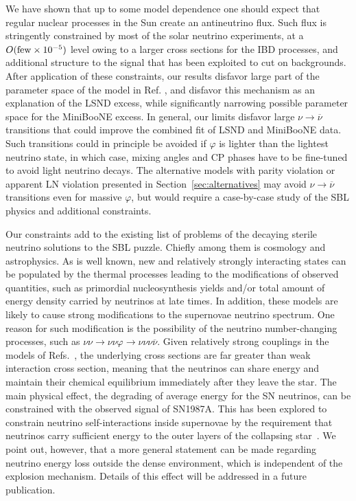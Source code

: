 \documentclass[
reprint,
superscriptaddress,
showpacs,
preprintnumbers,
nofootinbib,
nobibnotes,
amsmath,
amssymb, 
aps,
prd,
floatfix
]{revtex4-1}
\newcommand{\refsec}[1]{Section~\ref{#1}}
\renewcommand{\phi}{\varphi}
\begin{document}
We have shown that up to some model dependence one should expect that regular nuclear processes in the Sun create an antineutrino flux. Such flux is stringently constrained by most of the solar neutrino experiments, at a $O({\rm few}\times 10^{-5})$ level owing to a larger cross sections for the IBD processes, and additional structure to the signal that has been exploited to cut on backgrounds. After application of these constraints, our results disfavor large part of the parameter space of the model in Ref. \cite{Dentler:2019dhz}, and disfavor this mechanism as an explanation of the LSND excess, while significantly narrowing possible parameter space for the MiniBooNE excess. In general, our limits disfavor large $\nu\to\overline{\nu}$ transitions that could improve the combined fit of LSND and MiniBooNE data. Such transitions could in principle be avoided if $\phi$ is lighter than the lightest neutrino state, in which case, mixing angles and CP phases have to be fine-tuned to avoid light neutrino decays. The alternative models with parity violation or apparent LN violation presented in \refsec{sec:alternatives} may avoid $\nu\to\overline{\nu}$ transitions even for massive $\phi$, but would require a case-by-case study of the SBL physics and additional constraints.


Our constraints add to the existing list of problems of the decaying sterile neutrino solutions to the SBL puzzle. Chiefly among them is cosmology and astrophysics. As is well known, new and relatively strongly interacting states can be populated by the thermal processes leading to the modifications of observed quantities, such as primordial nucleosynthesis yields and/or total amount of energy density carried by neutrinos at late times. In addition, these models are likely to cause strong modifications to the supernovae neutrino spectrum. One reason for such modification is the possibility of the neutrino number-changing processes, such as $\nu\nu\to \nu\nu\varphi\to \nu\nu\nu\overline{\nu}$. Given relatively strong couplings in the models of Refs.~\cite{deGouvea:2019qre,Dentler:2019dhz}, the underlying cross sections are far greater than weak interaction cross section, meaning that the neutrinos can share energy and maintain their chemical equilibrium immediately after they leave the star. The main physical effect, the degrading of average energy for the SN neutrinos, can be constrained with the observed signal of SN1987A. This has been explored to constrain neutrino self-interactions inside supernovae by the requirement that neutrinos carry sufficient energy to the outer layers of the collapsing star~\cite{Shalgar:2019rqe}. We point out, however, that a more general statement can be made regarding neutrino energy loss outside the dense environment, which is independent of the explosion mechanism. Details of this effect will be addressed in a future publication.
\end{document}
